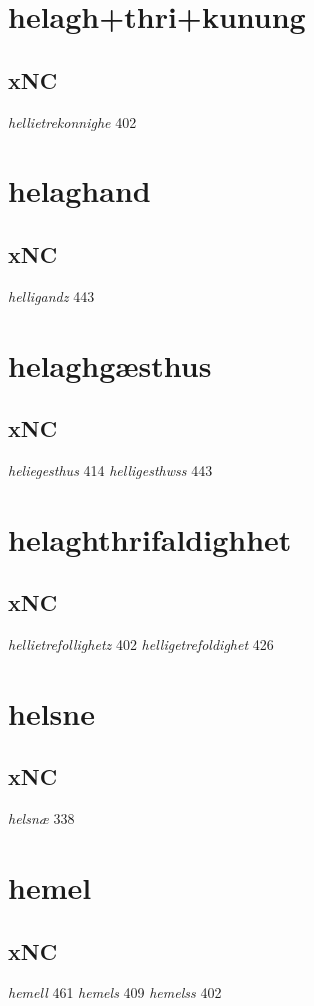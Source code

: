 \documentclass[a4paper,twocolumn]{article}
\begin{document}
\section{helagh+thri+kunung}
\label{sec:orgaecb1b5}
\subsection{xNC}
\label{sec:orga4c0da1}
\emph{hellietrekonnighe} 402 
\section{helaghand}
\label{sec:org5a429c2}
\subsection{xNC}
\label{sec:org0f86f67}
\emph{helligandz} 443 
\section{helaghgæsthus}
\label{sec:org2e68393}
\subsection{xNC}
\label{sec:org2cb440a}
\emph{heliegesthus} 414 \emph{helligesthwss} 443 
\section{helaghthrifaldighhet}
\label{sec:org9980ca1}
\subsection{xNC}
\label{sec:orga83499b}
\emph{hellietrefollighetz} 402 \emph{helligetrefoldighet} 426 
\section{helsne}
\label{sec:org067c9c7}
\subsection{xNC}
\label{sec:org21ecd3e}
\emph{helsnæ} 338 
\section{hemel}
\label{sec:org8a0605d}
\subsection{xNC}
\label{sec:org2b902ab}
\emph{hemell} 461 \emph{hemels} 409 \emph{hemelss} 402 
\end{document}
